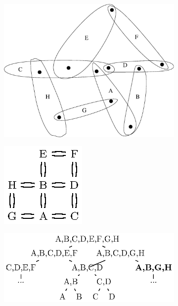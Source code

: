 \begin{figure}\centering
    \begin{subfigure}{0.2\linewidth}\centering
        \includegraphics[height=\myMinHeight]{../../img/bodypin}
        \caption{}\label{fig:bodypindrp:a}
    \end{subfigure}
    \hfill
    \begin{subfigure}{0.2\linewidth}\centering
        \includegraphics[height=\myMinHeight]{../../img/epsfromtikz/bodypin_graph}
        \caption{}\label{fig:bodypindrp:b}
    \end{subfigure}
    \hfill
    \begin{subfigure}{0.35\linewidth}\centering
        \includegraphics[height=\myMinHeight]{../../img/epsfromtikz/bodypin_drp}

\end{subfigure}
\end{figure}
